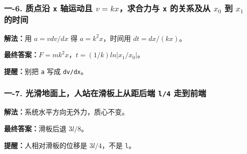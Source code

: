 \documentclass[12pt,a4paper]{ctexart}
\begin{document}
\subsubsection*{一-6. 质点沿 \texttt{x} 轴运动且 \(v=kx\)，求合力与 \texttt{x} 的关系及从 \(x_0\) 到 \(x_1\) 的时间}
\begin{tcolorbox}[colback=gray!2!white,colframe=black!60,title={题目}]

\end{tcolorbox}
\begin{tcolorbox}[colback=blue!2!white,colframe=blue!55!black,title={完整答案}]
\textbf{解法：}用 \(a=v dv/dx\) 得 \(a=k^2x\)，时间用 \(dt=dx/(kx)\)。\par
\textbf{最终答案：}\(F=mk^2x\)，\(t=(1/k)ln|x_1/x_0|\)。\par

\end{tcolorbox}
\begin{tcolorbox}[colback=red!2!white,colframe=red!55!black,title={易错点}]
\textbf{提醒：}别把 \texttt{a} 写成 \texttt{dv/dx}。\par
\end{tcolorbox}

\subsubsection*{一-7. 光滑地面上，人站在滑板上从距后端 \texttt{l/4} 走到前端}
\begin{tcolorbox}[colback=gray!2!white,colframe=black!60,title={题目}]

\end{tcolorbox}
\begin{tcolorbox}[colback=blue!2!white,colframe=blue!55!black,title={完整答案}]
\textbf{解法：}系统水平方向无外力，质心不变。\par
\textbf{最终答案：}滑板后退 \(3l/8\)。\par

\end{tcolorbox}
\begin{tcolorbox}[colback=red!2!white,colframe=red!55!black,title={易错点}]
\textbf{提醒：}人相对滑板的位移是 \(3l/4\)，不是 \texttt{l}。\par
\end{tcolorbox}
\end{document}
